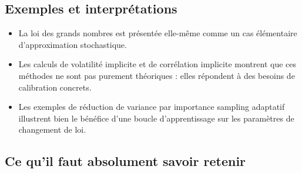 \documentclass[11pt,a4paper]{article}
\begin{document}
\subsection{Exemples et interprétations}

\begin{itemize}
  \item La loi des grands nombres est présentée elle-même comme un cas élémentaire d'approximation stochastique.
  \item Les calculs de volatilité implicite et de corrélation implicite montrent que ces méthodes ne sont pas purement théoriques : elles répondent à des besoins de calibration concrets.
  \item Les exemples de réduction de variance par importance sampling adaptatif illustrent bien le bénéfice d'une boucle d'apprentissage sur les paramètres de changement de loi.
\end{itemize}

\subsection{Ce qu'il faut absolument savoir retenir}
\end{document}
